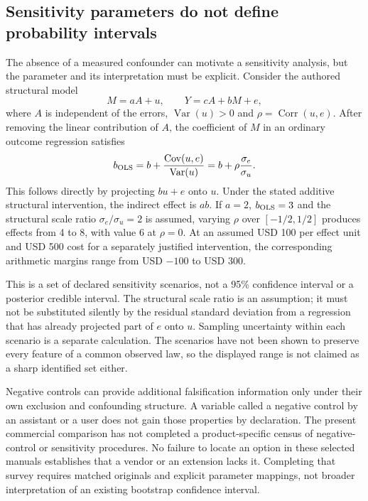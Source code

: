 \subsection{Sensitivity parameters do not define probability intervals}
\label{exec20:med-sensitivity}
The absence of a measured confounder can motivate a sensitivity analysis, but the parameter and its interpretation must be explicit. Consider the authored structural model
\begin{equation}
 M=aA+u,\qquad Y=cA+bM+e,
 \label{exec20:med-residual-law}
\end{equation}
where $A$ is independent of the errors, $\operatorname{Var}(u)>0$ and
$\rho=\operatorname{Corr}(u,e)$. After removing the linear contribution of $A$, the coefficient of $M$ in an ordinary outcome regression satisfies
\begin{equation}
 b_{\rm OLS}
   =b+\frac{\operatorname{Cov}(u,e)}{\operatorname{Var}(u)}
   =b+\rho\frac{\sigma_e}{\sigma_u}.
 \label{exec20:med-bias}
\end{equation}
This follows directly by projecting $bu+e$ onto $u$. Under the stated additive structural intervention, the indirect effect is $ab$. If $a=2$, $b_{\rm OLS}=3$ and the structural scale ratio $\sigma_e/\sigma_u=2$ is assumed, varying $\rho$ over $[-1/2,1/2]$ produces effects from 4 to 8, with value 6 at $\rho=0$. At an assumed USD 100 per effect unit and USD 500 cost for a separately justified intervention, the corresponding arithmetic margins range from USD $-100$ to USD 300.\citep{exec20_med_reference}

This is a set of declared sensitivity scenarios, not a 95\% confidence interval or a posterior credible interval. The structural scale ratio is an assumption; it must not be substituted silently by the residual standard deviation from a regression that has already projected part of $e$ onto $u$. Sampling uncertainty within each scenario is a separate calculation. The scenarios have not been shown to preserve every feature of a common observed law, so the displayed range is not claimed as a sharp identified set either.

Negative controls can provide additional falsification information only under their own exclusion and confounding structure. A variable called a negative control by an assistant or a user does not gain those properties by declaration. The present commercial comparison has not completed a product-specific census of negative-control or sensitivity procedures. No failure to locate an option in these selected manuals establishes that a vendor or an extension lacks it. Completing that survey requires matched originals and explicit parameter mappings, not broader interpretation of an existing bootstrap confidence interval.

